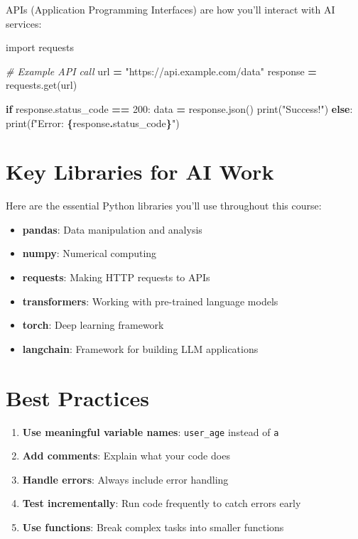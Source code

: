 \documentclass[
]{book}
\newenvironment{Shaded}{\begin{snugshade}}{\end{snugshade}}
\newcommand{\BuiltInTok}[1]{#1}
\newcommand{\CommentTok}[1]{\textcolor[rgb]{0.56,0.35,0.01}{\textit{#1}}}
\newcommand{\ControlFlowTok}[1]{\textcolor[rgb]{0.13,0.29,0.53}{\textbf{#1}}}
\newcommand{\DecValTok}[1]{\textcolor[rgb]{0.00,0.00,0.81}{#1}}
\newcommand{\ImportTok}[1]{#1}
\newcommand{\NormalTok}[1]{#1}
\newcommand{\OperatorTok}[1]{\textcolor[rgb]{0.81,0.36,0.00}{\textbf{#1}}}
\newcommand{\SpecialCharTok}[1]{\textcolor[rgb]{0.81,0.36,0.00}{\textbf{#1}}}
\newcommand{\SpecialStringTok}[1]{\textcolor[rgb]{0.31,0.60,0.02}{#1}}
\newcommand{\StringTok}[1]{\textcolor[rgb]{0.31,0.60,0.02}{#1}}
\providecommand{\tightlist}{%
  \setlength{\itemsep}{0pt}\setlength{\parskip}{0pt}}
\begin{document}
APIs (Application Programming Interfaces) are how you'll interact with AI services:

\begin{Shaded}
\begin{Highlighting}[]
\ImportTok{import}\NormalTok{ requests}

\CommentTok{\# Example API call}
\NormalTok{url }\OperatorTok{=} \StringTok{"https://api.example.com/data"}
\NormalTok{response }\OperatorTok{=}\NormalTok{ requests.get(url)}

\ControlFlowTok{if}\NormalTok{ response.status\_code }\OperatorTok{==} \DecValTok{200}\NormalTok{:}
\NormalTok{    data }\OperatorTok{=}\NormalTok{ response.json()}
    \BuiltInTok{print}\NormalTok{(}\StringTok{"Success!"}\NormalTok{)}
\ControlFlowTok{else}\NormalTok{:}
    \BuiltInTok{print}\NormalTok{(}\SpecialStringTok{f"Error: }\SpecialCharTok{\{}\NormalTok{response}\SpecialCharTok{.}\NormalTok{status\_code}\SpecialCharTok{\}}\SpecialStringTok{"}\NormalTok{)}
\end{Highlighting}
\end{Shaded}

\section{Key Libraries for AI Work}\label{key-libraries-for-ai-work}

Here are the essential Python libraries you'll use throughout this course:

\begin{itemize}
\tightlist
\item
  \textbf{pandas}: Data manipulation and analysis
\item
  \textbf{numpy}: Numerical computing
\item
  \textbf{requests}: Making HTTP requests to APIs
\item
  \textbf{transformers}: Working with pre-trained language models
\item
  \textbf{torch}: Deep learning framework
\item
  \textbf{langchain}: Framework for building LLM applications
\end{itemize}

\section{Best Practices}\label{best-practices}

\begin{enumerate}
\def\labelenumi{\arabic{enumi}.}
\tightlist
\item
  \textbf{Use meaningful variable names}: \texttt{user\_age} instead of \texttt{a}
\item
  \textbf{Add comments}: Explain what your code does
\item
  \textbf{Handle errors}: Always include error handling
\item
  \textbf{Test incrementally}: Run code frequently to catch errors early
\item
  \textbf{Use functions}: Break complex tasks into smaller functions
\end{enumerate}
\end{document}
